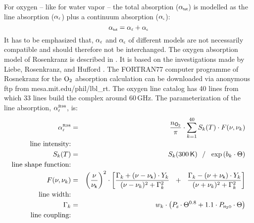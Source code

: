 {For oxygen -- like for water vapor -- the total absorption 
($\alpha_{\mbox{\tiny \sf tot}}$) is modelled as the line absorption ($\alpha_{\mbox{\tiny $\ell$}}$) plus a  
continuum absorption ($\alpha_{\mbox{\tiny \sf c}}$):
\begin{equation}
  \label{eq:o2:totabs}
  \alpha_{\mbox{\tiny \sf tot}} = \alpha_{\mbox{\tiny $\ell$}} + \alpha_{\mbox{\tiny \sf c}}
\end{equation}
It has to be emphasized that, $\alpha_{\mbox{\tiny $\ell$}}$ and $\alpha_{\mbox{\tiny \sf c}}$ of different
models are not necessarily compatible and should therefore not be interchanged.
%
%
%
%
\label{leveld:02_pwr98}
%
\label{levele:02_pwr98_line}
The oxygen absorption model of Rosenkranz is described in \cite{pwr:93}. It 
is based on the investigations made by Liebe, Rosenkranz, and Hufford 
\cite{liebeetal:92}. The FORTRAN77 computer programme of Rosnekranz for 
the $\mbox{O}_2$ absorption calculation can be downloaded via anonymous ftp from 
mesa.mit.edu/phil/lbl\_rt.
%
\label{levele:o2_r93_lines}
The oxygen line catalog has 40 lines from which 33 lines build the 
complex around 60\,GHz. The parameterization of the line absorption,
$\alpha^{\mbox{\tiny \rm R98}}_{\mbox{\tiny $\ell$}}$, is:
\begin{eqnarray}
  \alphapwrl & = & \frac{n_{\sf O_2}}{\pi} \cdot 
                   \sum_{k=1}^{40}{S_k(T) \cdot F(\nu,\nu_k)}\\
%
%
 \mbox{line intensity:} & & \nonumber\\
      S_k(T) & = & S_k(300\,{\sf K})~~/~~\exp{(b_k \cdot \Theta)}\nonumber\\
 \mbox{line shape function:} & & \nonumber\\
F(\nu,\nu_k) & = & \left(\frac{\nu}{\nuk}\right)^2 \cdot 
                   \left[\frac{\Gamma_k+(\nu-\nuk)\cdot Y_k}
                              {(\nu-\nu_k)^2+\Gamma_k^2}~~+~~
                         \frac{\Gamma_k-(\nu+\nuk)\cdot Y_k}
                              {(\nu+\nu_k)^2+\Gamma_k^2}\right] \nonumber\\
 \mbox{line width:} & & \nonumber\\
    \Gamma_k & = & w_k \cdot \left(          \pda  \cdot \Theta^{0.8} + 
                                   1.1 \cdot \phzo \cdot \Theta \right) \nonumber\\
 \mbox{line coupling:} & & \nonumber\\

\end{eqnarray}}
